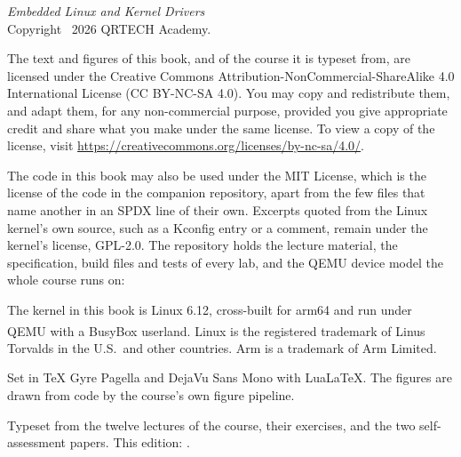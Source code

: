 \thispagestyle{empty}
\vspace*{\fill}
{\small
\noindent\textit{Embedded Linux and Kernel Drivers}\\
Copyright \textcopyright\ 2026 QRTECH Academy.

\medskip
\noindent The text and figures of this book, and of the course it is typeset from, are licensed
under the Creative Commons Attribution-NonCommercial-ShareAlike 4.0 International License
(CC BY-NC-SA 4.0). You may copy and redistribute them, and adapt them, for any non-commercial
purpose, provided you give appropriate credit and share what you make under the same license. To
view a copy of the license, visit \url{https://creativecommons.org/licenses/by-nc-sa/4.0/}.

\medskip
\noindent The code in this book may also be used under the MIT License, which is the license of the
code in the companion repository, apart from the few files that name another in an SPDX line of
their own. Excerpts quoted from the Linux kernel's own source, such as a Kconfig entry or a comment,
remain under the kernel's license, GPL-2.0. The repository holds the lecture material, the
specification, build files and tests of every lab, and the QEMU device model the whole course runs
on:

\medskip
\noindent\repo

\medskip
\noindent The kernel in this book is Linux 6.12, cross-built for arm64 and run under QEMU with a
BusyBox userland. Linux\textsuperscript{\textregistered} is the registered trademark of Linus
Torvalds in the U.S.\ and other countries. Arm is a trademark of Arm Limited.

\medskip
\noindent Set in TeX Gyre Pagella and DejaVu Sans Mono with Lua\LaTeX. The figures are drawn from
code by the course's own figure pipeline.

\medskip
\noindent\textcolor{muted}{Typeset from the twelve lectures of the course, their exercises, and the
two self-assessment papers. This edition: \bookedition.}
\par}
\cleardoublepage
